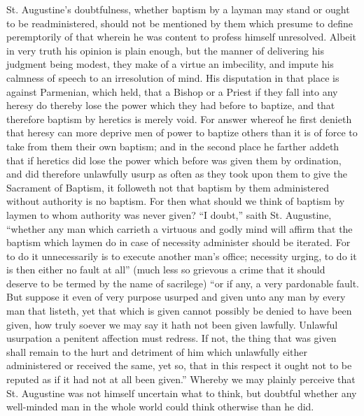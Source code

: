 St. Augustine’s doubtfulness, whether baptism by a layman may stand or ought to be readministered, should not be mentioned by them which presume to define peremptorily of that wherein he was content to profess himself unresolved. Albeit in very truth his opinion is plain enough, but the manner of delivering his judgment being modest, they make of a virtue an imbecility, and impute his calmness of speech to an irresolution of mind. His disputation in that place is against Parmenian, which held, that a Bishop or a Priest if they fall into any heresy do thereby lose the power which they had before to baptize, and that therefore baptism by heretics is merely void. For answer whereof he first denieth that heresy can more deprive men of power to baptize others than it is of force to take from them their own baptism; and in the second place he farther addeth that if heretics did lose the power which before was given them by ordination, and did therefore unlawfully usurp as often as they took upon them to give the Sacrament of Baptism, it followeth not that baptism by them administered without authority is no baptism. For then what should we think of baptism by laymen to whom authority was never given? “I doubt,” saith St. Augustine, “whether  any man which carrieth a virtuous and godly mind will affirm that the baptism which laymen do in case of necessity administer should be iterated. For to do it unnecessarily is to execute another man’s office; necessity urging, to do it is then either no fault at all” (much less so grievous a crime that it should deserve to be termed by the name of sacrilege) “or if any, a very pardonable fault. But suppose it even of very purpose usurped and given unto any man by every man that listeth, yet that which is given cannot possibly be denied to have been given, how truly soever we may say it hath not been given lawfully. Unlawful usurpation a penitent affection must redress. If not, the thing that was given shall remain to the hurt and detriment of him which unlawfully either administered or received the same, yet so, that in this respect it ought not to be reputed as if it had not at all been given.” Whereby we may plainly perceive that St. Augustine was not himself uncertain what to think, but doubtful whether any well-minded man in the whole world could think otherwise than he did.
